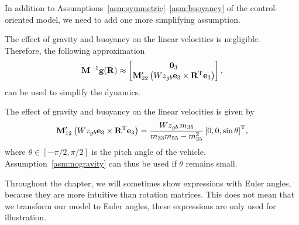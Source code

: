 In addition to Assumptions~\ref{asm:symmetric}--\ref{asm:buoyancy} of the control-oriented model, we need to add one more simplifying assumption.
\begin{asm}
    \label{asm:nogravity}
    The effect of gravity and buoyancy on the linear velocities is negligible.
    Therefore, the following approximation
    \begin{equation}
        \mathbf{M}^{-1}\mathbf{g}(\mathbf{R}) \approx \begin{bmatrix}
            \mathbf{0}_3 \\ \mathbf{M}_{22}^{\prime} \left(Wz_{gb} \mathbf{e}_3 \times \mathbf{R}^{\mathrm{T}} \mathbf{e}_3\right)
        \end{bmatrix},
    \end{equation}
    can be used to simplify the dynamics.
\end{asm}
\begin{rmk}
The effect of gravity and buoyancy on the linear velocities is given by
\begin{equation}
    \mathbf{M}_{12}^{\prime} \left(Wz_{gb} \mathbf{e}_3 \times \mathbf{R}^{\mathrm{T}} \mathbf{e}_3\right) = \frac{Wz_{gb}\,m_{35}}{m_{33}m_{55} - m_{35}^2}\left[0, 0, \sin\theta\right]^{\mathrm{T}}\!,
\end{equation}
where $\theta \in [-\pi/2, \pi/2]$ is the pitch angle of the vehicle.
Assumption~\ref{asm:nogravity} can thus be used if $\theta$ remains small.
\end{rmk}
\begin{rmk}
    Throughout the chapter, we will sometimes show expressions with Euler angles, because they are more intuitive than rotation matrices.
    This does not mean that we transform our model to Euler angles, these expressions are only used for illustration.
\end{rmk}
